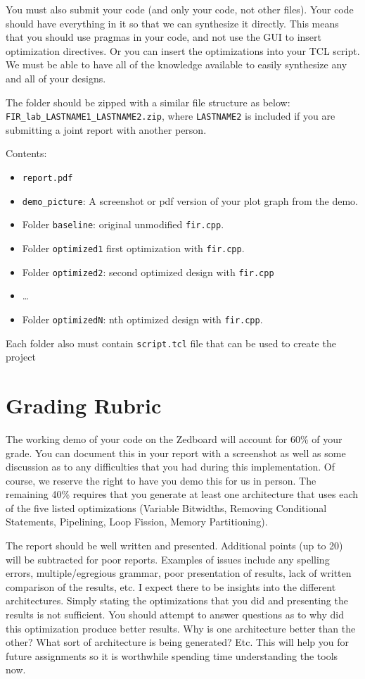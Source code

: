 You must also submit your code (and only your code, not other files). Your code should have everything in it so that we can synthesize it directly. This means that you should use pragmas in your code, and not use the GUI to insert optimization directives. Or you can insert the optimizations into your TCL script. We must be able to have all of the knowledge available to easily synthesize any and all of your designs.

The folder should be zipped with a similar file structure as below:
\texttt{FIR\_lab\_LASTNAME1\_LASTNAME2.zip}, where \texttt{LASTNAME2} is included if you are submitting a joint report with another person.

Contents:
\begin{itemize}
\item \texttt{report.pdf}
\item \texttt{demo\_picture}: A screenshot or pdf version of your plot graph from the demo.
\item Folder \texttt{baseline}: original unmodified \texttt{fir.cpp}.
\item Folder \texttt{optimized1} first optimization with \texttt{fir.cpp}.
\item Folder \texttt{optimized2}: second optimized design with \texttt{fir.cpp}
\item \dots
\item Folder \texttt{optimizedN}: nth optimized design with \texttt{fir.cpp}.
\end{itemize}
Each folder also must contain \texttt{script.tcl} file that can be used to create the project

\section{Grading Rubric}
The working demo of your code on the Zedboard will account for 60\% of your grade. You can document this in your report with a screenshot as well as some discussion as to any difficulties that you had during this implementation. Of course, we reserve the right to have you demo this for us in person. The remaining 40\% requires that you generate at least one architecture that uses each of the five listed optimizations (Variable Bitwidths, Removing Conditional Statements, Pipelining, Loop Fission, Memory Partitioning). 

The report should be well written and presented. Additional points (up to 20) will be subtracted for poor reports. Examples of issues include any spelling errors, multiple/egregious grammar, poor presentation of results, lack of written comparison of the results, etc. I expect there to be insights into the different architectures. Simply stating the optimizations that you did and presenting the results is not sufficient. You should attempt to answer questions as to why did this optimization produce better results. Why is one architecture better than the other? What sort of architecture is being generated? Etc. This will help you for future assignments so it is worthwhile spending time understanding the tools now.
